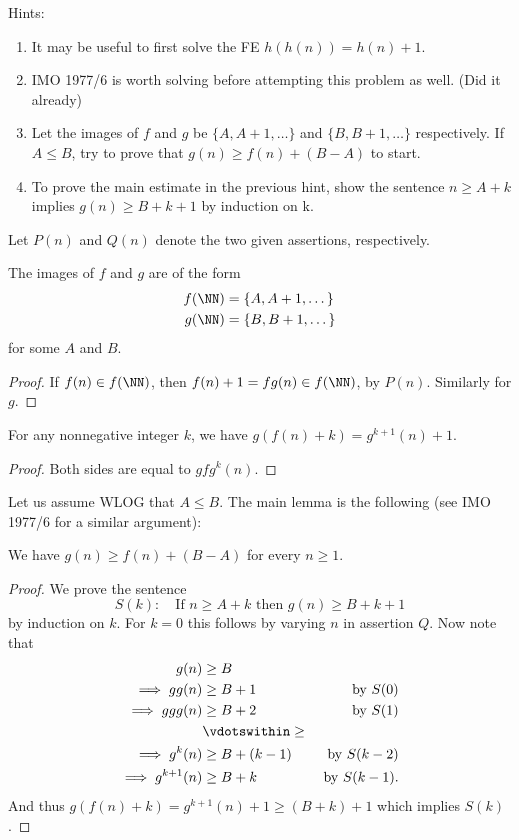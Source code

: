 \documentclass[11pt,twoside]{scrartcl}
\begin{document}
    Hints:
    \begin{enumerate}
        \item It may be useful to first solve the FE $h(h(n)) = h(n) + 1$.
        \item IMO 1977/6 is worth solving before attempting this problem as well. (Did it already)
        \item Let the images of $f$ and $g$ be $\{A,A+1,\ldots\}$ and 
        $\{B,B+1,\ldots\}$ respectively. If $A \le B$, try to prove that  $g(n) \ge f(n) + (B-A)$ to start.
        \item To prove the main estimate in the previous hint, show the sentence $n \ge A+k$ implies $g(n) \ge B+k+1$ by induction on k.
    \end{enumerate}
    \begin{soln}
        Let $P(n)$ and $Q(n)$ denote the two given assertions, respectively.

\begin{claim*}
	The images of $f$ and $g$ are of the form
	\begin{align*}
		f(\NN) &= \left\{ A, A+1, \dots \right\} \\
		g(\NN) &= \left\{ B, B+1, \dots \right\}
	\end{align*}
	for some $A$ and $B$.
\end{claim*}
\begin{proof}
	If $f(n) \in f(\NN)$, then $f(n)+1 = fg(n) \in f(\NN)$, by $P(n)$.
	Similarly for $g$.
\end{proof}

\begin{claim*}
	For any nonnegative integer $k$, we have
	$g(f(n)+k) = g^{k+1}(n)+1$.
\end{claim*}
\begin{proof}
	Both sides are equal to $gfg^k(n)$.
\end{proof}

Let us assume WLOG that $A \le B$.
The main lemma is the following (see IMO 1977/6 for a similar argument):
\begin{lemma*}
	We have $g(n) \ge f(n) + (B-A)$ for every $n \ge 1$.
\end{lemma*}
\begin{proof}
	We prove the sentence
	\[ S(k) \colon \quad \text{If } n \ge A+k \text{ then } g(n) \ge B+k+1 \]
	by induction on $k$.
	For $k = 0$ this follows by varying $n$ in assertion $Q$.
	Now note that
	\begin{align*}
		g(n) &\ge B \\
		\implies gg(n) &\ge B+1 &\text{by $S(0)$} \\
		\implies ggg(n) &\ge B+2 &\text{by $S(1)$} \\
		& \vdotswithin\ge \\
		\implies g^{k}(n) &\ge B+(k-1) &\text{ by $S(k-2)$} \\
		\implies g^{k+1}(n) &\ge B+k &\text{ by $S(k-1)$}.
	\end{align*}
	And thus $g(f(n)+k) = g^{k+1}(n) + 1 \ge (B+k)+1$ which implies $S(k)$.


\end{proof}
\end{soln}
\end{document}
